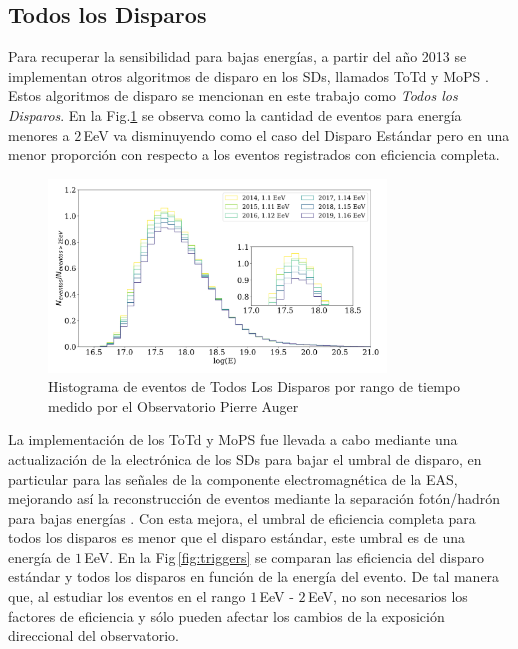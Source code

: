  
\subsection{Todos los Disparos}

Para recuperar la sensibilidad para bajas energías, a partir del año 2013  se implementan otros algoritmos de disparo en los SDs, llamados ToTd y MoPS \cite{pierre2013plans}. Estos algoritmos de disparo se mencionan en este trabajo como \textit{Todos los Disparos}.  En la Fig.\ref{fig:TLD} se observa como la cantidad de eventos para energía menores a $2\,$EeV va disminuyendo como el caso del Disparo Estándar pero en una menor proporción con respecto a los eventos registrados con eficiencia completa.

\begin{figure}[H]
	\centering
	\includegraphics[width=0.8\textwidth]{histograma_AllTriggers.pdf}
	\caption{Histograma de eventos de  Todos Los Disparos por rango de tiempo medido por el Observatorio Pierre Auger}
	\label{fig:TLD}
\end{figure}

La implementación de los ToTd y MoPS fue llevada a cabo mediante una actualización de la electrónica de los SDs para bajar el umbral de disparo, en particular para las señales de la componente electromagnética de la EAS, mejorando así la reconstrucción de eventos mediante la separación fotón/hadrón para bajas energías  \cite{pierre2013plans}. Con esta mejora, el umbral de eficiencia completa para todos los disparos es menor que el disparo estándar, este umbral es de una energía de $1\,$EeV. En la Fig\,\ref{fig:triggers} se comparan las eficiencia del disparo estándar y todos los disparos en función de la energía del evento. De tal manera que, al estudiar los eventos en el rango $1\,$EeV - $2\,$EeV,  no son necesarios los factores de eficiencia y sólo pueden afectar los cambios de la exposición direccional del observatorio.


